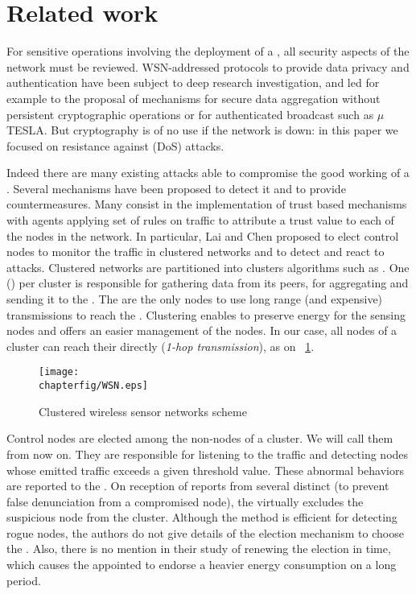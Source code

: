 \section{Related work}
\label{ea:sec:related}

For sensitive operations involving the deployment of a \wsn, all security aspects of the network must be reviewed.
WSN-addressed protocols to provide data privacy\cite{OX09} and authentication\cite{SOBMCN11} have been subject to deep research investigation, and led for example to the proposal of mechanisms for secure data aggregation without persistent cryptographic operations\cite{WDSX07} or for authenticated broadcast such as $\mu$TESLA\cite{PSWCT02}.
But cryptography is of no use if the network is down: in this paper we focused on resistance against \dos (DoS) attacks.

Indeed there are many existing attacks able to compromise the good working of a \wsn.%
Several mechanisms have been proposed to detect it and to provide countermeasures\cite{SSS11}. %
Many consist in the implementation of trust based mechanisms\cite{MC10,F-GRL07} with agents applying set of rules\cite{RKKK13} on traffic to attribute a trust value to each of the nodes in the network.
In particular, Lai and Chen\cite{LC08} proposed to elect control nodes to monitor the traffic in clustered networks and to detect and react to \dos attacks.
Clustered networks are partitioned into clusters \via algorithms such as \leach\cite{HHT02}.
One \ch (\CH) per cluster is responsible for gathering data from its peers, for aggregating and sending it to the \bs.
The \CHs are the only nodes to use long range (and expensive) transmissions to reach the \bs.
Clustering enables to preserve energy for the sensing nodes and offers an easier management of the nodes.
In our case, all nodes of a cluster can reach their \ch directly (\emph{1-hop transmission}), as on \figurename~\ref{ea:fig:wsn}.
\begin{figure}[h]
    \centering
    \texttt{[image: \\chapterfig/WSN.eps]}
    \caption{Clustered wireless sensor networks scheme}\label{ea:fig:wsn}
\end{figure}

Control nodes are elected among the non-\ch nodes of a cluster.
We will call them \cns from now on.
They are responsible for listening to the traffic and detecting nodes whose emitted traffic exceeds a given threshold value.
These abnormal behaviors are reported to the \ch.
On reception of reports from several distinct \cns (to prevent false denunciation from a compromised node), the \CH virtually excludes the suspicious node from the cluster.
Although the method is efficient for detecting rogue nodes, the authors do not give details of the election mechanism to choose the \cns.
Also, there is no mention in their study of renewing the election in time, which causes the appointed \cns to endorse a heavier energy consumption on a long period.

